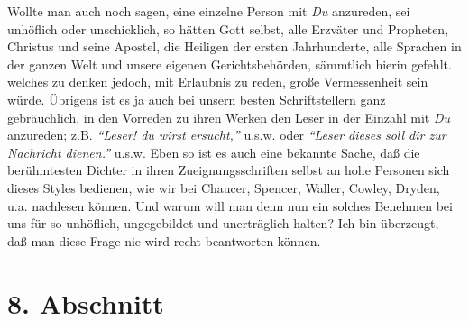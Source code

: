 Wollte man auch noch sagen, eine einzelne Person mit \textit{Du} anzureden, sei
unhöflich oder unschicklich, so hätten Gott selbst, alle Erzväter und Propheten,
Christus und seine Apostel, die Heiligen der ersten Jahrhunderte, alle Sprachen
in der ganzen Welt und unsere eigenen Gerichtsbehörden, sämmtlich hierin
gefehlt. welches zu denken jedoch, mit Erlaubnis zu reden, große Vermessenheit
sein würde. Übrigens ist es ja auch bei unsern besten Schriftstellern ganz
gebräuchlich, in den Vorreden zu ihren Werken den Leser in der Einzahl mit
\textit{Du} anzureden; z.B. \textit{"`Leser! du wirst ersucht,"'} u.s.w. oder \textit{"`Leser dieses
soll dir zur Nachricht dienen."'} u.s.w. Eben so ist es auch eine bekannte Sache,
daß die berühmtesten Dichter in ihren Zueignungsschriften selbst an hohe
Personen sich dieses Styles bedienen, wie wir bei Chaucer, Spencer, Waller,
Cowley, Dryden, u.a. nachlesen können. Und warum will man denn nun ein solches
Benehmen bei uns für so unhöflich, ungegebildet und unerträglich halten? Ich bin
überzeugt, daß man diese Frage nie wird recht beantworten können.

\section{8. Abschnitt} \label{kap10_ab8}

